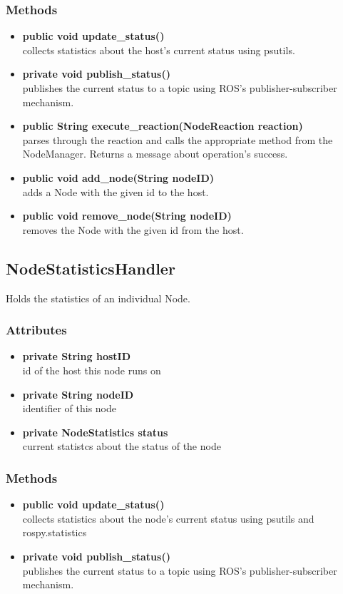 \subsubsection{Methods}
\begin{itemize}
	\item \textbf{public void update\_status()}\\
			collects statistics about the host's current status using psutils.
	\item \textbf{private void publish\_status()}\\
			publishes the current status to a topic using ROS's publisher-subscriber mechanism.
	\item \textbf{public String execute\_reaction(NodeReaction reaction)}\\
			parses through the reaction and calls the appropriate method from the NodeManager.
			Returns a message about operation's success.
	\item \textbf{public void add\_node(String nodeID)}\\
			adds a Node with the given id to the host.
	\item \textbf{public void remove\_node(String nodeID)}\\
			removes the Node with the given id from the host.
\end{itemize}

\subsection{NodeStatisticsHandler}
Holds the statistics of an individual Node.

\subsubsection{Attributes}
\begin{itemize}
	\item \textbf{private String hostID}\\
	id of the host this node runs on
	\item \textbf{private String nodeID}\\
	identifier of this node
	\item \textbf{private NodeStatistics status}\\
	current statistcs about the status of the node
\end{itemize}

\subsubsection{Methods}
\begin{itemize}
	\item \textbf{public void update\_status()}\\
	collects statistics about the node's current status using psutils and rospy.statistics
	\item \textbf{private void publish\_status()}\\
	publishes the current status to a topic using ROS's publisher-subscriber mechanism.
\end{itemize}


